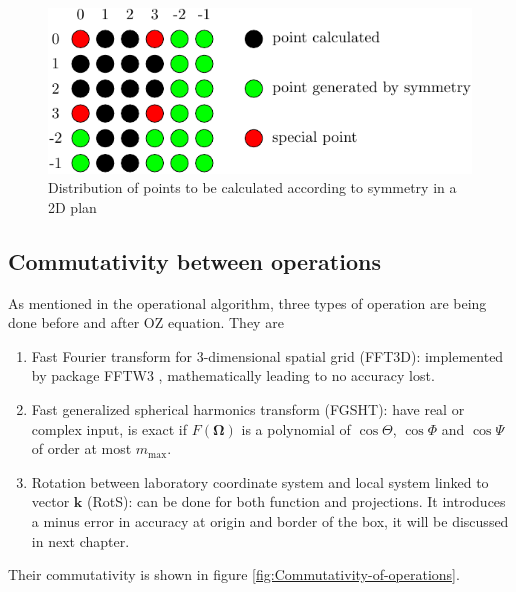 \begin{figure}[h]
\begin{centering}
\includegraphics{_figure/test_lmn}
\par\end{centering}

\caption{Distribution of points to be calculated according to symmetry in a
2D plan}
\end{figure}



\subsection{Commutativity between operations\label{sub:Commutativity-between-operations}}

As mentioned in the operational algorithm, three types of operation
are being done before and after OZ equation. They are
\begin{enumerate}
\item Fast Fourier transform for 3-dimensional spatial grid (FFT3D): implemented
by package FFTW3 \citep{FFTW3}, mathematically leading to no accuracy
lost.
\item Fast generalized spherical harmonics transform (FGSHT): have real
or complex input, is exact if $F(\mathbf{\Omega})$ is a polynomial
of $\cos\Theta$, $\cos\Phi$ and $\cos\Psi$ of order at most $m_{\mathrm{max}}$.
\item Rotation between laboratory coordinate system and local system linked
to vector $\mathbf{k}$ (RotS): can be done for both function and
projections. It introduces a minus error in accuracy at origin and
border of the box, it will be discussed in next chapter.
\end{enumerate}
Their commutativity is shown in figure \ref{fig:Commutativity-of-operations}.

